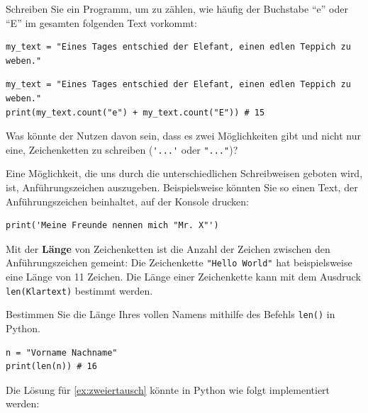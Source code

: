 \begin{myexercise}
    Schreiben Sie ein Programm, um zu zählen, wie häufig der Buchstabe \enquote{e} oder \enquote{E} im gesamten folgenden Text vorkommt:

    \begin{lstlisting}
my_text = "Eines Tages entschied der Elefant, einen edlen Teppich zu weben."
\end{lstlisting}

    \begin{myanswer}
        \begin{lstlisting}
my_text = "Eines Tages entschied der Elefant, einen edlen Teppich zu weben."
print(my_text.count("e") + my_text.count("E")) # 15
\end{lstlisting}
    \end{myanswer}
\end{myexercise}


\begin{mychallenge}
    Was könnte der Nutzen davon sein, dass es zwei Möglichkeiten gibt und nicht nur eine, Zeichenketten zu schreiben (\lstinline|'...'| oder \lstinline|"..."|)?
    \begin{myanswer}
        Eine Möglichkeit, die uns durch die unterschiedlichen Schreibweisen geboten wird, ist, Anführungszeichen auszugeben. Beispielsweise könnten Sie so einen Text, der Anführungszeichen beinhaltet, auf der Konsole drucken:
        \begin{lstlisting}
print('Meine Freunde nennen mich "Mr. X"')
\end{lstlisting}
    \end{myanswer}
\end{mychallenge}

Mit der \textbf{Länge} von Zeichenketten ist die Anzahl der Zeichen zwischen den Anführungszeichen gemeint: Die Zeichenkette \lstinline|"Hello World"| hat beispielsweise eine Länge von 11 Zeichen. Die Länge einer Zeichenkette kann mit dem Ausdruck \lstinline|len(Klartext)| bestimmt werden.

\begin{myexercise}
    Bestimmen Sie die Länge Ihres vollen Namens mithilfe des Befehls \lstinline|len()| in Python.
    \begin{lstlisting}[numbers=none]
n = "Vorname Nachname"
print(len(n)) # 16
\end{lstlisting}
\end{myexercise}

Die Lösung für \cref{ex:zweiertausch} könnte in Python wie folgt implementiert werden:



